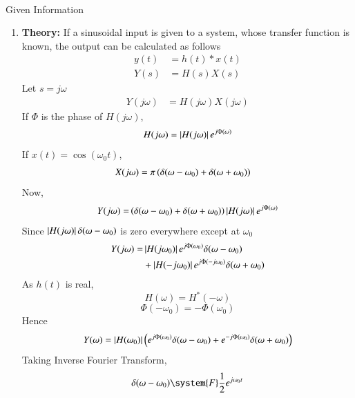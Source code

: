 \documentclass[journal,12pt,twocolumn]{IEEEtran}
\theoremstyle{remark}
\begin{document}
\solution \\
\begin{table}[h]
    \centering
    
    \caption{Given Information} 
    \label{37.Gate22.EE.tab: 1}                                                                                                                                                                                                 
\end{table}
\begin{enumerate}
\item \textbf{Theory: } If a sinusoidal input is given to a system, whose transfer function is known, the output can be calculated as follows
\begin{align}
    y(t)&=h(t)*x(t)\\
    Y(s)&=H(s)X(s)
\end{align}
Let $s=j\omega$
\begin{align}
    Y(j\omega)&=H(j\omega)X(j\omega)
\end{align}
If $\Phi$ is the phase of $H(j\omega)$, 
\begin{align}
    H(j\omega)=\left\vert H(j\omega)\right\vert e^{j\Phi(\omega)}
\end{align}
If $x(t)=\cos{(\omega_0t)}$, 
\begin{align}
    X(j\omega)&=\pi \left(\delta(\omega-\omega_0)+\delta(\omega+\omega_0)\right)
\end{align}
Now,
\begin{align}
    Y(j\omega)=&\left(\delta(\omega-\omega_0)+\delta(\omega+\omega_0)\right)\left\vert H(j\omega)\right\vert e^{j\Phi(\omega)}\\
\end{align}
Since $\left\vert H(j\omega)\right\vert\delta(\omega-\omega_0)$ is zero everywhere except at $\omega_0$ 
\begin{align}
    Y(j\omega)=&\left\vert H(j\omega_0)\right\vert e^{j\Phi(\omega_0)}\delta(\omega-\omega_0) \\&+ \left\vert H(-j\omega_0)\right\vert e^{j\Phi(-j\omega_0)}\delta(\omega+\omega_0)
\end{align}
As $h(t)$ is real, $${H(\omega)}={H^{*}(-\omega)}$$ 
 $$\Phi(-\omega_0)=-\Phi(\omega_0)$$
Hence 
 \begin{align}
    Y(\omega)= \left\vert H(\omega_0)\right\vert\left(e^{j\Phi(\omega_0)}\delta(\omega-\omega_0) + e^{-j\Phi(\omega_0)}\delta(\omega+\omega_0)\right)
\end{align}
Taking Inverse Fourier Transform, 
\begin{align}
    &\delta(\omega-\omega_0) \system{F} \frac{1}{2}e^{j\omega_0t}\\

\end{align}
\end{enumerate}
\end{document}
